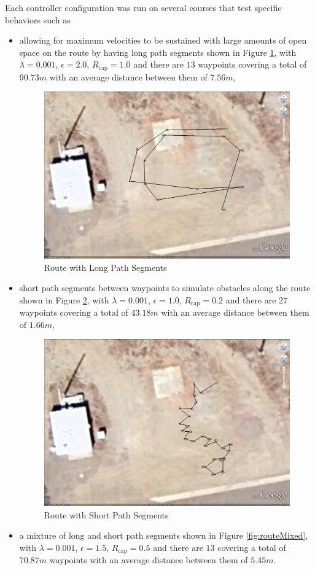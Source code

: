 Each controller configuration was run on several courses that test specific behaviors such as
\begin{itemize}
\item allowing for maximum velocities to be sustained with large amounts of open space on the route by having long path segments shown in Figure \ref{fig:routeLong}, with $\lambda = 0.001$, $\epsilon = 2.0$, $R_{\text{cap}} = 1.0$ and there are $13$ waypoints covering a total of $90.73 m$ with an average distance between them of $7.56 m$,
\begin{figure}[ht!]
	\centering
	\includegraphics[width=.5\textwidth]{images/GE/GELongSegmentsRoute2}
	\caption{Route with Long Path Segments}
	\label{fig:routeLong}
\end{figure}
\item short path segments between waypoints to simulate obstacles along the route shown in Figure \ref{fig:routeShort}, with $\lambda = 0.001$, $\epsilon = 1.0$, $R_{\text{cap}} = 0.2$ and there are $27$ waypoints covering a total of $43.18 m$ with an average distance between them of $1.66 m$,
\begin{figure}[ht!]
	\centering
	\includegraphics[width=.5\textwidth]{images/GE/GEShortSegmentsRoute2}
	\caption{Route with Short Path Segments}
	\label{fig:routeShort}
\end{figure}
\item a mixture of long and short path segments shown in Figure \ref{fig:routeMixed}, with $\lambda = 0.001$, $\epsilon = 1.5$, $R_{\text{cap}} = 0.5$ and there are $13$ covering a total of $70.87 m$ waypoints with an average distance between them of $5.45 m$.

\end{itemize}
